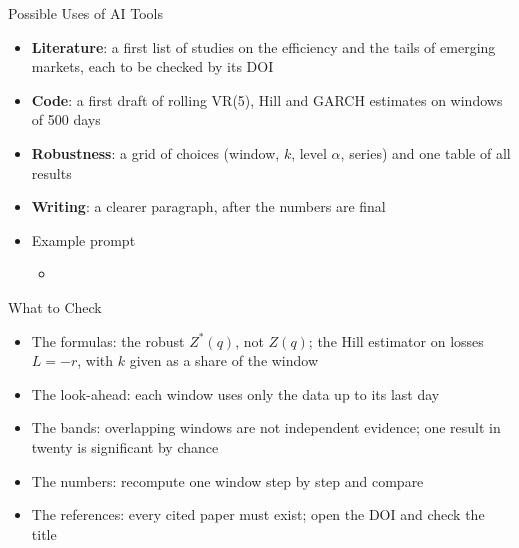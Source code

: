 \begin{frame}{Possible Uses of AI Tools}
\itemsize{\small}
\begin{itemize}
    \item \textbf{Literature}: a first list of studies on the efficiency and the tails of emerging markets, each to be checked by its DOI
    \item \textbf{Code}: a first draft of rolling VR(5), Hill and GARCH estimates on windows of 500 days
    \item \textbf{Robustness}: a grid of choices (window, $k$, level $\alpha$, series) and one table of all results
    \item \textbf{Writing}: a clearer paragraph, after the numbers are final
    \item Example prompt
    \begin{itemize}
        \item {}
    \end{itemize}
\end{itemize}
\end{frame}

\begin{frame}{What to Check}
\itemsize{\small}
\begin{itemize}
    \item The formulas: the robust $Z^*(q)$, not $Z(q)$; the Hill estimator on losses $L = -r$, with $k$ given as a share of the window
    \item The look-ahead: each window uses only the data up to its last day
    \item The bands: overlapping windows are not independent evidence; one result in twenty is significant by chance
    \item The numbers: recompute one window step by step and compare
    \item The references: every cited paper must exist; open the DOI and check the title
\end{itemize}
\end{frame}

